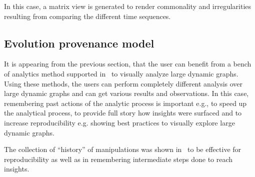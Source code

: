 \begin{description}
	In this case, a matrix view is generated to render commonality and irregularities resulting from comparing the different time sequences.

\end{description}













		
\subsection{Evolution provenance model}\label{A02:evoDM}
It is appearing from the previous section, that the user can benefit from a bench of analytics method supported in~\cite{bruder:18} to visually analyze large dynamic graphs. 
Using these methods, the users can perform completely different analysis over large dynamic graphs and can get various results and observations. In this case, remembering past actions of the analytic process is important e.g., to speed up the analytical process, to provide full story how insights were surfaced and to increase reproducibility e.g. showing best practices to visually explore large dynamic graphs.

The collection of ``history'' of manipulations was shown in~\cite{Herschel2017survey} to be effective for reproducibility as well as in remembering intermediate steps done to reach insights.

